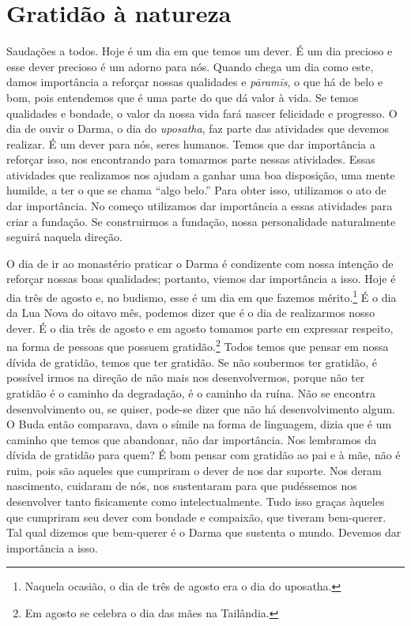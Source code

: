 
\chapter{Gratidão à natureza}
\markright{\theChapterAuthor}

Saudações a todos. Hoje é um dia em que temos um dever. É um dia
precioso e esse dever precioso é um adorno para nós. Quando chega um
dia como este, damos importância a reforçar nossas qualidades e
\emph{pāramīs}, o que há de belo e bom, pois entendemos que é
uma parte do que dá valor à vida. Se temos qualidades e bondade, o
valor da nossa vida fará nascer felicidade e progresso. O dia de ouvir
o Darma, o dia do \emph{uposatha}, faz parte das atividades que
devemos realizar. É um dever para nós, seres humanos. Temos que dar
importância a reforçar isso, nos encontrando para tomarmos parte nessas
atividades. Essas atividades que realizamos nos ajudam a ganhar uma boa
disposição, uma mente humilde, a ter o que se chama “algo belo.” Para
obter isso, utilizamos o ato de dar importância. No começo utilizamos
dar importância a essas atividades para criar a fundação. Se
construirmos a fundação, nossa personalidade naturalmente seguirá
naquela direção. 

O dia de ir ao monastério praticar o Darma é condizente com nossa
intenção de reforçar nossas boas qualidades; portanto, viemos dar
importância a isso. Hoje é dia três de agosto e, no budismo, esse é um
dia em que fazemos mérito.\footnote{Naquela ocasião, o dia de três de
agosto era o dia do uposatha.} É o dia da Lua Nova do oitavo mês,
podemos dizer que é o dia de realizarmos nosso dever. É o dia três de
agosto e em agosto tomamos parte em expressar respeito, na forma de
pessoas que possuem gratidão.\footnote{Em agosto se celebra o dia das
mães na Tailândia.} Todos temos que pensar em nossa dívida de
gratidão, temos que ter gratidão. Se não soubermos ter gratidão, é
possível irmos na direção de não mais nos desenvolvermos, porque não
ter gratidão é o caminho da degradação, é o caminho da ruína. Não se
encontra desenvolvimento ou, se quiser, pode-se dizer que não há
desenvolvimento algum. O Buda então comparava, dava o símile na forma
de linguagem, dizia que é um caminho que temos que abandonar, não dar
importância. Nos lembramos da dívida de gratidão para quem? É bom
pensar com gratidão ao pai e à mãe, não é ruim, pois são aqueles que
cumpriram o dever de nos dar suporte. Nos deram nascimento, cuidaram de
nós, nos sustentaram para que pudéssemos nos desenvolver tanto
fisicamente como intelectualmente. Tudo isso graças àqueles que
cumpriram seu dever com bondade e compaixão, que tiveram bem-querer.
Tal qual dizemos que bem-querer é o Darma que sustenta o mundo. Devemos
dar importância a isso. 

